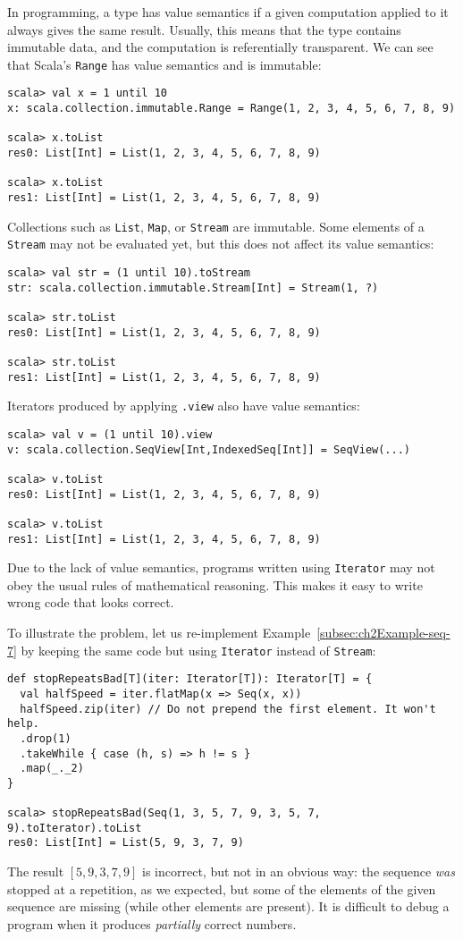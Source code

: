 In programming, a type has value semantics if a given computation
applied to it always gives the same result. Usually, this means that
the type contains immutable data, and the computation is referentially
transparent. We can see that Scala's \lstinline!Range! has value
semantics and is immutable:
\begin{lstlisting}
scala> val x = 1 until 10
x: scala.collection.immutable.Range = Range(1, 2, 3, 4, 5, 6, 7, 8, 9)

scala> x.toList
res0: List[Int] = List(1, 2, 3, 4, 5, 6, 7, 8, 9)

scala> x.toList
res1: List[Int] = List(1, 2, 3, 4, 5, 6, 7, 8, 9) 
\end{lstlisting}
Collections such as \lstinline!List!, \lstinline!Map!, or \lstinline!Stream!
are immutable. Some elements of a \lstinline!Stream! may not be evaluated
yet, but this does not affect its value semantics:
\begin{lstlisting}
scala> val str = (1 until 10).toStream
str: scala.collection.immutable.Stream[Int] = Stream(1, ?)

scala> str.toList
res0: List[Int] = List(1, 2, 3, 4, 5, 6, 7, 8, 9)

scala> str.toList
res1: List[Int] = List(1, 2, 3, 4, 5, 6, 7, 8, 9) 
\end{lstlisting}
Iterators produced by applying \lstinline!.view! also have value
semantics:
\begin{lstlisting}
scala> val v = (1 until 10).view
v: scala.collection.SeqView[Int,IndexedSeq[Int]] = SeqView(...)

scala> v.toList
res0: List[Int] = List(1, 2, 3, 4, 5, 6, 7, 8, 9)

scala> v.toList
res1: List[Int] = List(1, 2, 3, 4, 5, 6, 7, 8, 9)
\end{lstlisting}

Due to the lack of value semantics, programs written using \lstinline!Iterator!
may not obey the usual rules of mathematical reasoning. This
makes it easy to write wrong code that looks correct.

To illustrate the problem, let us re-implement Example~\ref{subsec:ch2Example-seq-7}
by keeping the same code but using \lstinline!Iterator! instead of
\lstinline!Stream!:
\begin{lstlisting}
def stopRepeatsBad[T](iter: Iterator[T]): Iterator[T] = {
  val halfSpeed = iter.flatMap(x => Seq(x, x))
  halfSpeed.zip(iter) // Do not prepend the first element. It won't help.
  .drop(1)
  .takeWhile { case (h, s) => h != s }
  .map(_._2)
}

scala> stopRepeatsBad(Seq(1, 3, 5, 7, 9, 3, 5, 7, 9).toIterator).toList
res0: List[Int] = List(5, 9, 3, 7, 9)
\end{lstlisting}
The result $\left[5,9,3,7,9\right]$ is incorrect, but not in an obvious
way: the sequence \emph{was} stopped at a repetition, as we expected,
but some of the elements of the given sequence are missing (while
other elements are present). It is difficult to debug a program when
it produces \emph{partially} correct numbers.

